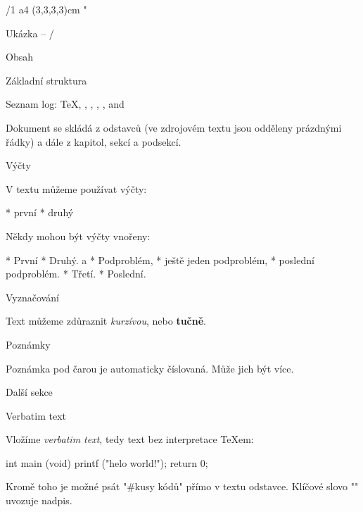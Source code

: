 

\chyph                      %
\fontfam[Schola]            %
\margins/1 a4 (3,3,3,3)cm   %
\typosize[11/13]            %
\activettchar"              %
\hyperlinks\Blue\Green      %

\def\center{\noindent\hfil} %

\tit Ukázka -- \OpTeX/

\nonum\notoc\sec Obsah

\maketoc

\sec Základní struktura

Seznam log: \TeX, \OpTeX, \LuaTeX, \XeTeX, \OPmac, \CS and \csplain

Dokument se skládá z odstavců (ve zdrojovém textu jsou odděleny prázdnými řádky)
a dále z kapitol, sekcí a podsekcí.

\secc Výčty

V textu můžeme používat výčty:

\begitems
* první
* druhý
\enditems


Někdy mohou být výčty vnořeny:

\begitems
* První
* Druhý.
  \begitems \style a
  * Podproblém,
  * ještě jeden podproblém,
  * poslední podproblém.
  \enditems
* Třetí.
* Poslední.
\enditems
 



\secc Vyznačování

Text můžeme zdůraznit {\it kurzívou}, nebo {\bf tučně}. 

\secc[poznamky]  Poznámky

Poznámka pod čarou je automaticky číslovaná.
Může jich být více.


\sec[dalsi] Další sekce

\secc Verbatim text

Vložíme {\it verbatim text}, tedy text  bez interpretace
\TeX{}em:

\begtt
int main (void) {
  printf ("helo world!\n");
  return 0;
}
\endtt

Kromě toho je možné psát "#kusy {kódů}" přímo v textu odstavce.
Klíčové slovo "\tit" uvozuje nadpis.

